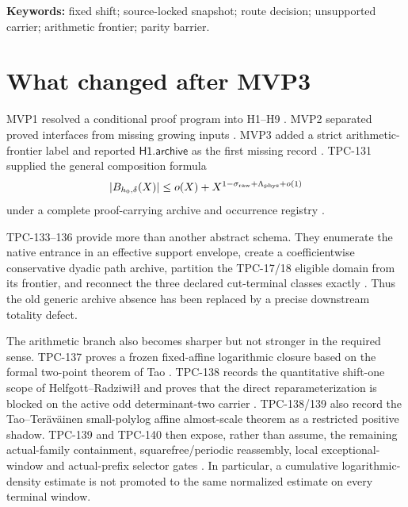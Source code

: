 \documentclass[11pt]{article}
\theoremstyle{definition}
\theoremstyle{remark}
\begin{document}
\noindent\textbf{Keywords:} fixed shift; source-locked snapshot;
route decision; unsupported carrier; arithmetic frontier; parity
barrier.

\medskip
\noindent{}

\section{What changed after MVP3}

MVP1 resolved a conditional proof program into H1--H9
\citep{WangMVP1}.  MVP2 separated proved interfaces from missing
growing inputs \citep{WangTPC120}.  MVP3 added a strict
arithmetic-frontier label and reported
\(\mathsf{H1.archive}\) as the first missing record
\citep{WangTPC132}.  TPC-131 supplied the general composition formula
\[
 |B_{h_0,\delta}(X)|
 \le o(X)+X^{1-\sigma_{\rm raw}+\Lambda_{\rm phys}+o(1)}
\label{eq:synthesis}
\]
under a complete proof-carrying archive and occurrence registry
\citep{WangTPC131}.

TPC-133--136 provide more than another abstract schema.  They
enumerate the native entrance in an effective support envelope,
create a coefficientwise conservative dyadic path archive, partition
the TPC-17/18 eligible domain from its frontier, and reconnect the
three declared cut-terminal classes exactly
\citep{WangTPC133,WangTPC134,WangTPC135,WangTPC136}.  Thus the old
generic archive absence has been replaced by a precise downstream
totality defect.

The arithmetic branch also becomes sharper but not stronger in the
required sense.  TPC-137 proves a frozen fixed-affine logarithmic
closure based on the formal two-point theorem of Tao
\citep{Tao2016,WangTPC137}.  TPC-138 records the quantitative
shift-one scope of Helfgott--Radziwi{\l}{\l} and proves that the
direct reparameterization is blocked on the active odd
determinant-two carrier \citep{HelfgottRadziwill2021,WangTPC138}.
TPC-138/139 also record the Tao--Ter\"av\"ainen small-polylog affine
almost-scale theorem as a restricted positive shadow.  TPC-139 and
TPC-140 then expose, rather than assume, the remaining actual-family
containment, squarefree/periodic reassembly, local exceptional-window
and actual-prefix selector gates \citep{WangTPC139,WangTPC140}.  In
particular, a cumulative logarithmic-density estimate is not promoted
to the same normalized estimate on every terminal window.
\end{document}
